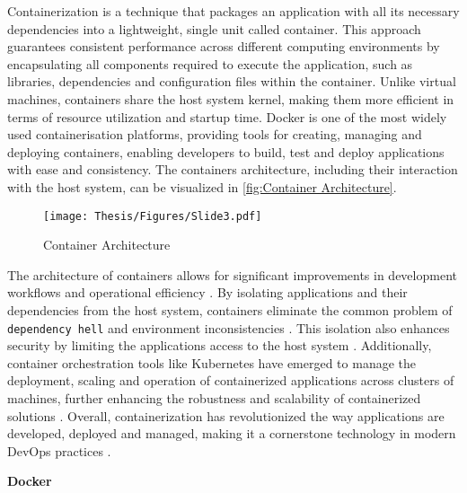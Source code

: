 Containerization is a technique that packages an application with all its necessary dependencies into a lightweight, single unit called container. This approach guarantees consistent performance across different computing environments by encapsulating all components required to execute the application, such as libraries, dependencies and configuration files within the container. Unlike virtual machines, containers share the host system kernel, making them more efficient in terms of resource utilization and startup time. Docker is one of the most widely used containerisation platforms, providing tools for creating, managing and deploying containers, enabling developers to build, test and deploy applications with ease and consistency. The containers architecture, including their interaction with the host system, can be visualized in \autoref{fig:Container Architecture}. \cite{Docker_container}

\captionsetup{justification=centering}
\begin{figure}[h]
\centering
\texttt{[image: Thesis/Figures/Slide3.pdf]}
\caption{\label{fig:Container Architecture}Container Architecture \cite{Docker_container}}
\end{figure}

\vspace{0.2cm}

The architecture of containers allows for significant improvements in development workflows and operational efficiency \cite{Kubernetes_doc}. By isolating applications and their dependencies from the host system, containers eliminate the common problem of \texttt{dependency hell} and environment inconsistencies \cite{Kubernetes_doc}. This isolation also enhances security by limiting the applications access to the host system \cite{Kubernetes_doc}. Additionally, container orchestration tools like Kubernetes have emerged to manage the deployment, scaling and operation of containerized applications across clusters of machines, further enhancing the robustness and scalability of containerized solutions \cite{Kubernetes_doc}. Overall, containerization has revolutionized the way applications are developed, deployed and managed, making it a cornerstone technology in modern DevOps practices \cite{redhat_docs}.

\textbf{Docker}

